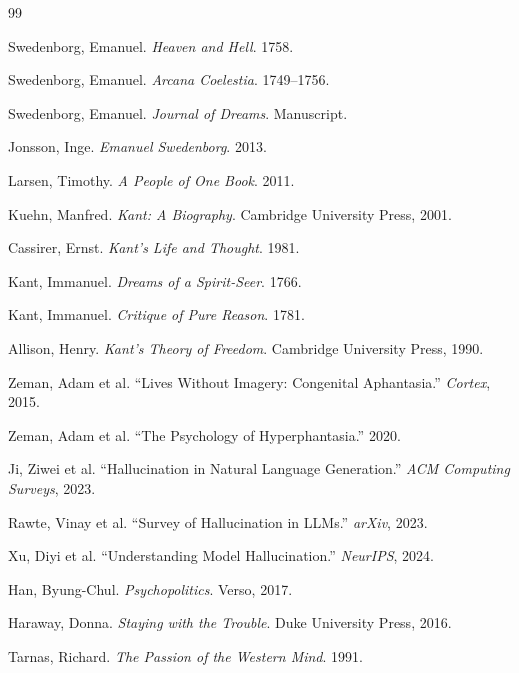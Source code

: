 \documentclass[12pt]{article}
\begin{document}
\newpage
\begin{thebibliography}{99}

Swedenborg, Emanuel. \emph{Heaven and Hell}. 1758.

Swedenborg, Emanuel. \emph{Arcana Coelestia}. 1749--1756.

Swedenborg, Emanuel. \emph{Journal of Dreams}. Manuscript.

Jonsson, Inge. \emph{Emanuel Swedenborg}. 2013.

Larsen, Timothy. \emph{A People of One Book}. 2011.

Kuehn, Manfred. \emph{Kant: A Biography}. Cambridge University Press, 2001.

Cassirer, Ernst. \emph{Kant's Life and Thought}. 1981.

Kant, Immanuel. \emph{Dreams of a Spirit-Seer}. 1766.

Kant, Immanuel. \emph{Critique of Pure Reason}. 1781.

Allison, Henry. \emph{Kant's Theory of Freedom}. Cambridge University Press, 1990.

Zeman, Adam et al. ``Lives Without Imagery: Congenital Aphantasia.'' \emph{Cortex}, 2015.

Zeman, Adam et al. ``The Psychology of Hyperphantasia.'' 2020.

Ji, Ziwei et al. ``Hallucination in Natural Language Generation.'' \emph{ACM Computing Surveys}, 2023.

Rawte, Vinay et al. ``Survey of Hallucination in LLMs.'' \emph{arXiv}, 2023.

Xu, Diyi et al. ``Understanding Model Hallucination.'' \emph{NeurIPS}, 2024.

Han, Byung-Chul. \emph{Psychopolitics}. Verso, 2017.

Haraway, Donna. \emph{Staying with the Trouble}. Duke University Press, 2016.

Tarnas, Richard. \emph{The Passion of the Western Mind}. 1991.

\end{thebibliography}
\end{document}
